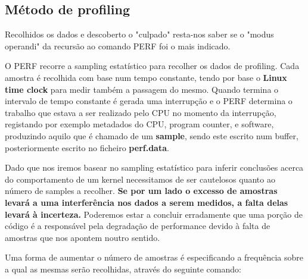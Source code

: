 \documentclass[conference,compsoc]{IEEEtran}
\begin{document}
                                                                                                                                                                                                                       \subsection{Método de profiling}

                                                                                                                                                                                                                       Recolhidos os dados e descoberto o "culpado" resta-nos saber se o "modus operandi" da recursão ao comando PERF foi o mais indicado.\par
                                                                                                                                                                                                                       O PERF recorre a sampling estatístico para recolher os dados de profiling. Cada amostra é recolhida com base num tempo constante, tendo por base o \textbf{Linux time clock} para medir também a passagem do mesmo. Quando termina o intervalo de tempo constante é gerada uma interrupção e o PERF determina o trabalho que estava a ser realizado pelo CPU no momento da interrupção, registando por exemplo metadados do CPU, program counter, e software, produzindo aquilo que é chamado de um \textbf{sample}, sendo este escrito num buffer, posteriormente escrito no ficheiro \textbf{perf.data}. \par 

                                                                                                                                                                                                                       Dado que nos iremos basear no sampling estatístico para inferir conclusões acerca do comportamento de um kernel necessitamos de ser cautelosos quanto ao número de samples a recolher. \textbf{Se por um lado o excesso de amostras levará a uma interferência nos dados a serem medidos, a falta delas levará à incerteza.} Poderemos estar a concluir erradamente que uma porção de código é a responsável pela degradação de performance devido à falta de amostras que nos apontem noutro sentido. \par 

                                                                                                                                                                                                                       Uma forma de aumentar o número de amostras é especificando a frequência sobre a qual as mesmas serão recolhidas, através do seguinte comando: 
\end{document}
